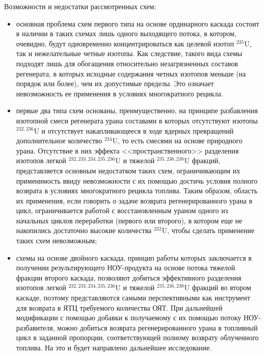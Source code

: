 Возможности и недостатки рассмотренных схем:
\begin{itemize}
  \item основная проблема схем первого типа на основе ординарного каскада состоит в наличии в таких схемах лишь одного выходящего потока, в котором, очевидно, будут одновременно концентрироваться как целевой изотоп $^{235}$U, так и нежелательные четные изотопы. Как следствие, такого вида схемы подходят лишь для обогащения относительно незагрязненных составов регенерата, в которых исходные содержания четных изотопов меньше (на порядок или более), чем их допустимые пределы. Это означает невозможность ее применения в условиях многократного рецикла.
  \item первые два типа схем основаны, преимущественно, на принципе разбавления изотопной смеси регенерата урана составами в которых отсутствуют изотопы $^{232,236}$U и отсутствует накапливающееся в ходе ядерных превращений дополнительное количество $^{234}$U, то есть смесями на основе природного урана. Отсутствие в них эффекта <<пространственного>> разделения изотопов легкой $^{232,233,234,235,236}$U и тяжелой $^{235,236,238}$U фракций, представляется основным недостатком таких схем, ограничивающим их применимость ввиду невозможности с их помощью достичь условия полного возврата в условиях многократного рецикла топлива. Таким образом, область их применения, если говорить о задаче возврата регенерированного урана в цикл, ограничивается работой с восстановленным ураном одного из начальных циклов переработки (первого или второго), в котором еще не накопились достаточно высокие количества $^{232}$U, чтобы сделать применение таких схем невозможным;
  \item схемы на основе двойного каскада, принцип работы которых заключается в получении результирующего НОУ-продукта на основе потока тяжелой фракции второго каскада, позволяют добиться эффективного разделения изотопов легкой $^{232,233,234,235,236}$U и тяжелой $^{235,236,238}$U фракций во втором каскаде, поэтому представляются самыми перспективными как инструмент для возврата в ЯТЦ требуемого количества ОЯТ. При дальнейшей модификации с помощью добавки к получаемому с их помощью потоку НОУ-разбавителя, можно добиться возврата регенерированного урана в топливный цикл в заданной пропорции, соответствующей полному возврату облученного топлива. На это и будет направлено дальнейшее исследование.
\end{itemize}


